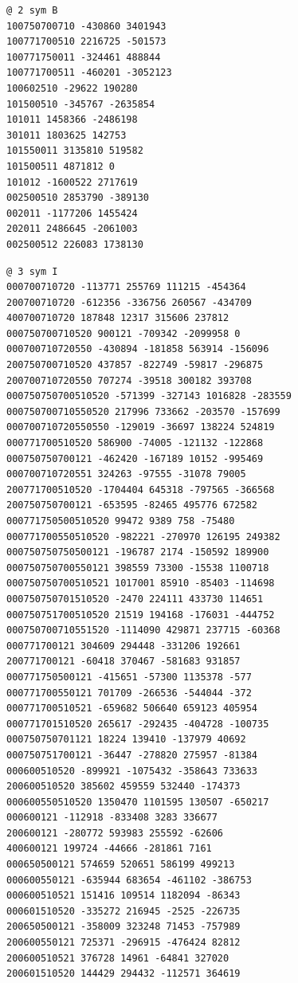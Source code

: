 \begin{Verbatim}[fontsize=\footnotesize]
@ 2 sym B
100750700710 -430860 3401943
100771700510 2216725 -501573
100771750011 -324461 488844
100771700511 -460201 -3052123
100602510 -29622 190280
101500510 -345767 -2635854
101011 1458366 -2486198
301011 1803625 142753
101550011 3135810 519582
101500511 4871812 0
101012 -1600522 2717619
002500510 2853790 -389130
002011 -1177206 1455424
202011 2486645 -2061003
002500512 226083 1738130
\end{Verbatim}
\begin{Verbatim}[fontsize=\footnotesize]
@ 3 sym I
000700710720 -113771 255769 111215 -454364
200700710720 -612356 -336756 260567 -434709
400700710720 187848 12317 315606 237812
000750700710520 900121 -709342 -2099958 0
000700710720550 -430894 -181858 563914 -156096
200750700710520 437857 -822749 -59817 -296875
200700710720550 707274 -39518 300182 393708
000750750700510520 -571399 -327143 1016828 -283559
000750700710550520 217996 733662 -203570 -157699
000700710720550550 -129019 -36697 138224 524819
000771700510520 586900 -74005 -121132 -122868
000750750700121 -462420 -167189 10152 -995469
000700710720551 324263 -97555 -31078 79005
200771700510520 -1704404 645318 -797565 -366568
200750750700121 -653595 -82465 495776 672582
000771750500510520 99472 9389 758 -75480
000771700550510520 -982221 -270970 126195 249382
000750750750500121 -196787 2174 -150592 189900
000750750700550121 398559 73300 -15538 1100718
000750750700510521 1017001 85910 -85403 -114698
000750750701510520 -2470 224111 433730 114651
000750751700510520 21519 194168 -176031 -444752
000750700710551520 -1114090 429871 237715 -60368
000771700121 304609 294448 -331206 192661
200771700121 -60418 370467 -581683 931857
000771750500121 -415651 -57300 1135378 -577
000771700550121 701709 -266536 -544044 -372
000771700510521 -659682 506640 659123 405954
000771701510520 265617 -292435 -404728 -100735
000750750701121 18224 139410 -137979 40692
000750751700121 -36447 -278820 275957 -81384
000600510520 -899921 -1075432 -358643 733633
200600510520 385602 459559 532440 -174373
000600550510520 1350470 1101595 130507 -650217
000600121 -112918 -833408 3283 336677
200600121 -280772 593983 255592 -62606
400600121 199724 -44666 -281861 7161
000650500121 574659 520651 586199 499213
000600550121 -635944 683654 -461102 -386753
000600510521 151416 109514 1182094 -86343
000601510520 -335272 216945 -2525 -226735
200650500121 -358009 323248 71453 -757989
200600550121 725371 -296915 -476424 82812
200600510521 376728 14961 -64841 327020
200601510520 144429 294432 -112571 364619

\end{Verbatim}
